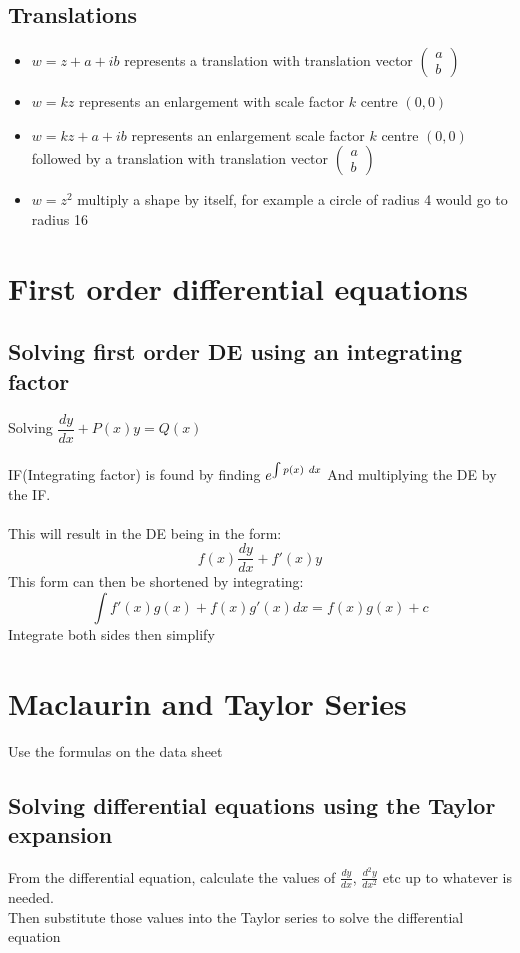 \documentclass{article}[18pt]
\begin{document}
\subsection{Translations}
\begin{itemize}
\item $w=z+a+ib$ represents a translation with translation vector $\begin{pmatrix}
a\\b
\end{pmatrix}$
\item $w=kz$ represents an enlargement with scale factor $k$ centre $(0,0)$
\item $w=kz+a+ib$ represents an enlargement scale factor $k$ centre $(0,0)$ followed by a translation with translation vector $\begin{pmatrix}
a\\b
\end{pmatrix}$
\item $w=z^2$ multiply a shape by itself, for example a circle of radius 4 would go to radius 16
\end{itemize}

\section{First order differential equations}
\subsection{Solving first order DE using an integrating factor}
Solving $\dfrac{dy}{dx}+P(x)y=Q(x)$\\
\\
IF(Integrating factor) is found by finding $\mathlarger{e^{\int p(x) \ dx}}$ And multiplying the DE by the IF.\\
\\
This will result in the DE being in the form:
$$f(x)\frac{dy}{dx}+f'(x)y$$
This form can then be shortened by integrating:
$$\int f'(x)g(x)+f(x)g'(x) dx=f(x)g(x)+c$$
Integrate both sides then simplify


\section{Maclaurin and Taylor Series}
Use the formulas on the data sheet
\subsection{Solving differential equations using the Taylor expansion}
From the differential equation, calculate the values of $\frac{dy}{dx}$, $\frac{d^2y}{dx^2}$ etc up to whatever is needed.\\
Then substitute those values into the Taylor series to solve the differential equation
\end{document}
